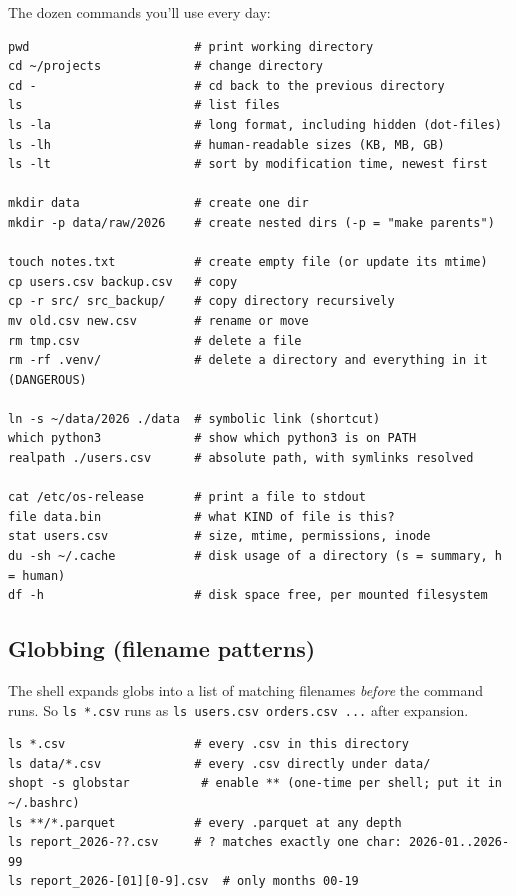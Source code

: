 \documentclass[11pt,a4paper]{article}
\begin{document}
The dozen commands you'll use every day:

\begin{lstlisting}[style=bashstyle]
pwd                       # print working directory
cd ~/projects             # change directory
cd -                      # cd back to the previous directory
ls                        # list files
ls -la                    # long format, including hidden (dot-files)
ls -lh                    # human-readable sizes (KB, MB, GB)
ls -lt                    # sort by modification time, newest first

mkdir data                # create one dir
mkdir -p data/raw/2026    # create nested dirs (-p = "make parents")

touch notes.txt           # create empty file (or update its mtime)
cp users.csv backup.csv   # copy
cp -r src/ src_backup/    # copy directory recursively
mv old.csv new.csv        # rename or move
rm tmp.csv                # delete a file
rm -rf .venv/             # delete a directory and everything in it (DANGEROUS)

ln -s ~/data/2026 ./data  # symbolic link (shortcut)
which python3             # show which python3 is on PATH
realpath ./users.csv      # absolute path, with symlinks resolved

cat /etc/os-release       # print a file to stdout
file data.bin             # what KIND of file is this?
stat users.csv            # size, mtime, permissions, inode
du -sh ~/.cache           # disk usage of a directory (s = summary, h = human)
df -h                     # disk space free, per mounted filesystem
\end{lstlisting}

\subsection*{Globbing (filename patterns)}

The shell expands globs into a list of matching filenames \emph{before}
the command runs. So \texttt{ls *.csv} runs as \texttt{ls users.csv
orders.csv ...} after expansion.

\begin{lstlisting}[style=bashstyle]
ls *.csv                  # every .csv in this directory
ls data/*.csv             # every .csv directly under data/
shopt -s globstar          # enable ** (one-time per shell; put it in ~/.bashrc)
ls **/*.parquet           # every .parquet at any depth
ls report_2026-??.csv     # ? matches exactly one char: 2026-01..2026-99
ls report_2026-[01][0-9].csv  # only months 00-19
\end{lstlisting}
\end{document}
